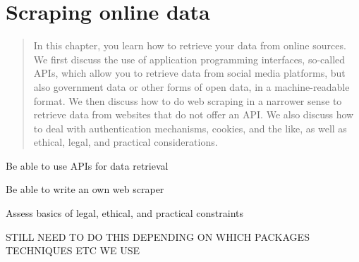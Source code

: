 \chapter{Scraping online data}
\label{chap:scraping}

\begin{abstract}
In this chapter, you learn how to retrieve your data from online sources. We first discuss the use of application programming interfaces, so-called APIs, which allow you to retrieve data from social media platforms, but also government data or other forms of open data, in a machine-readable format. We then discuss how to do web scraping in a narrower sense to retrieve data from websites that do not offer an API. We also discuss how to deal with authentication mechanisms, cookies, and the like, as well as ethical, legal, and practical considerations.
\end{abstract}



\begin{objectives}
\item Be able to use APIs for data retrieval
\item Be able to write an own web scraper
\item Assess basics of legal, ethical, and practical constraints
\end{objectives}

\begin{feature}
STILL NEED TO DO THIS DEPENDING ON WHICH PACKAGES TECHNIQUES ETC WE USE
\end{feature}










